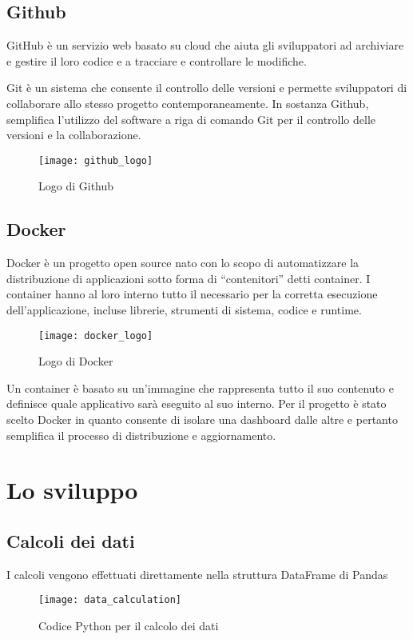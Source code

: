 \subsection{Github}
\noindent GitHub è un servizio web basato su cloud che aiuta gli sviluppatori ad archiviare e gestire il loro codice e a tracciare e controllare le modifiche.

\noindent Git è un sistema che consente il controllo delle versioni e permette sviluppatori di collaborare allo stesso progetto contemporaneamente.
\noindent In sostanza Github, semplifica l’utilizzo del software a riga di comando Git per il controllo delle versioni e la collaborazione.


\begin{figure}[htp]
    \centering
    \texttt{[image: github\_logo]}
    \caption{Logo di Github}
\end{figure}

\subsection{Docker}
\noindent Docker è un progetto open source nato con lo scopo di automatizzare la distribuzione di applicazioni sotto forma di “contenitori” detti container.
I container hanno al loro interno tutto il necessario per la corretta esecuzione dell’applicazione, incluse librerie, strumenti di sistema, codice e runtime.

\begin{figure}[htp]
    \centering
    \texttt{[image: docker\_logo]}
    \caption{Logo di Docker}
\end{figure}

\noindent Un container è basato su un’immagine che rappresenta tutto il suo contenuto e definisce quale applicativo sarà eseguito al suo interno. 
Per il progetto è stato scelto Docker in quanto consente di isolare una dashboard dalle altre e pertanto semplifica il processo di distribuzione e aggiornamento.

\section{Lo sviluppo}

\subsection{Calcoli dei dati}
I calcoli vengono effettuati direttamente nella struttura DataFrame di Pandas
\begin{figure}[htp]
    \centering
    \texttt{[image: data\_calculation]}
    \caption{Codice Python per il calcolo dei dati}
\end{figure}


